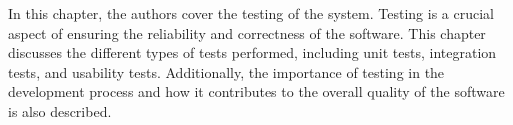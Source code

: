 In this chapter, the authors cover the testing of the system.
Testing is a crucial aspect of ensuring the reliability and correctness of the software.
This chapter discusses the different types of tests performed, including unit tests,
integration tests, and usability tests.
Additionally, the importance of testing in the development process and how it contributes
to the overall quality of the software is also described.
